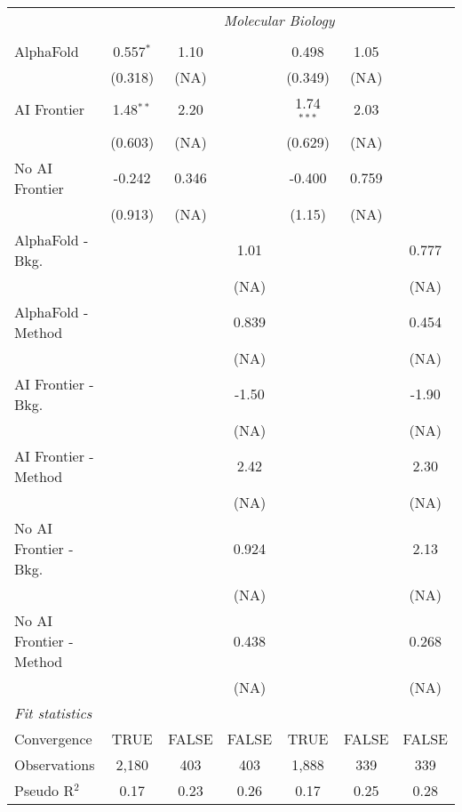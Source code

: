 \begin{tabular}{lcccccc}
 & \multicolumn{6}{c}{\textit{Molecular Biology}} \\ \\
   AlphaFold               & 0.557$^{*}$ & 1.10  &       & 0.498        & 1.05  &   \\   
                           & (0.318)     & (NA)  &       & (0.349)      & (NA)  &   \\   
   AI Frontier             & 1.48$^{**}$ & 2.20  &       & 1.74$^{***}$ & 2.03  &   \\   
                           & (0.603)     & (NA)  &       & (0.629)      & (NA)  &   \\   
   No AI Frontier          & -0.242      & 0.346 &       & -0.400       & 0.759 &   \\   
                           & (0.913)     & (NA)  &       & (1.15)       & (NA)  &   \\   
   AlphaFold - Bkg.        &             &       & 1.01  &              &       & 0.777\\   
                           &             &       & (NA)  &              &       & (NA)\\   
   AlphaFold - Method      &             &       & 0.839 &              &       & 0.454\\   
                           &             &       & (NA)  &              &       & (NA)\\   
   AI Frontier - Bkg.      &             &       & -1.50 &              &       & -1.90\\   
                           &             &       & (NA)  &              &       & (NA)\\   
   AI Frontier - Method    &             &       & 2.42  &              &       & 2.30\\   
                           &             &       & (NA)  &              &       & (NA)\\   
   No AI Frontier - Bkg.   &             &       & 0.924 &              &       & 2.13\\   
                           &             &       & (NA)  &              &       & (NA)\\   
   No AI Frontier - Method &             &       & 0.438 &              &       & 0.268\\   
                           &             &       & (NA)  &              &       & (NA)\\   
   \midrule
   \emph{Fit statistics}\\
   Convergence             &TRUE         & FALSE & FALSE & TRUE         & FALSE & FALSE\\  
   Observations            & 2,180       & 403   & 403   & 1,888        & 339   & 339\\  
   Pseudo R$^2$            & 0.17        & 0.23  & 0.26  & 0.17         & 0.25  & 0.28\\  
   

\end{tabular}
